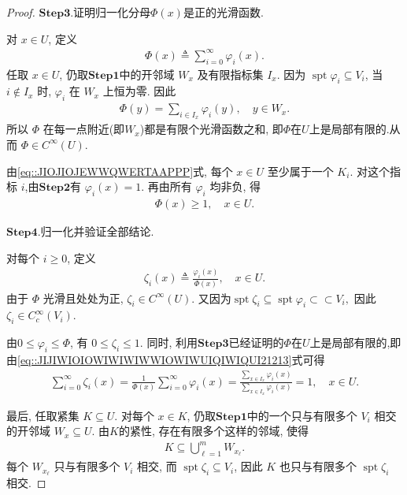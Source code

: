 \documentclass[../../main.tex]{subfiles}
\begin{document}
\begin{proof}
\noindent$\mathbf{Step}\mathbf{3}.${\heiti 证明归一化分母$\Phi(x)$是正的光滑函数.}

对 $x\in U$, 定义
\begin{align*}
\Phi(x)\triangleq\sum\limits_{i=0}^{\infty}\varphi_i(x).
\end{align*}
任取 $x\in U$, 仍取$\mathbf{Step}\mathbf{1}$中的开邻域 $W_x$ 及有限指标集 $I_x$. 因为 $\operatorname{spt}\varphi_i\subseteq V_i$, 当 $i\notin I_x$ 时, $\varphi_i$ 在 $W_x$ 上恒为零. 因此
\begin{align}\label{eq::JIJIWIOIOWIWIWIWWIOWIWUIQIWIQUI21213}
\Phi(y)=\sum\limits_{i\in I_x}\varphi_i(y),\quad y\in W_x.
\end{align}
所以 $\Phi$ 在每一点附近(即$W_x$)都是有限个光滑函数之和, 即$\Phi$在$U$上是局部有限的.从而 $\Phi\in C^\infty(U)$.

由\eqref{eq::JIOJIOJEWWQWERTAAPPP}式, 每个 $x\in U$ 至少属于一个 $K_i$. 对这个指标 $i$,由$\mathbf{Step}\mathbf{2}$有 $\varphi_i(x)=1$. 再由所有 $\varphi_i$ 均非负, 得
\begin{align*}
\Phi(x)\geqslant1,\quad x\in U.
\end{align*}

\noindent$\mathbf{Step}\mathbf{4}.${\heiti 归一化并验证全部结论.}

对每个 $i\geqslant0$, 定义
\begin{align*}
\zeta_i(x)\triangleq\frac{\varphi_i(x)}{\Phi(x)},\quad x\in U.
\end{align*}
由于 $\Phi$ 光滑且处处为正, $\zeta_i\in C^\infty(U)$. 又因为$\operatorname{spt}\zeta_i
\subseteq\operatorname{spt}\varphi_i
\subset\subset V_i,$
因此 $\zeta_i\in C_c^\infty(V_i)$.

由$0\leqslant\varphi_i\leqslant\Phi$, 有 $0\leqslant\zeta_i\leqslant1$. 同时, 利用$\mathbf{Step}\mathbf{3}$已经证明的$\Phi$在$U$上是局部有限的,即由\eqref{eq::JIJIWIOIOWIWIWIWWIOWIWUIQIWIQUI21213}式可得
\begin{align*}
\sum_{i=0}^{\infty}{\zeta _i\left( x \right)}=\frac{1}{\Phi \left( x \right)}\sum_{i=0}^{\infty}{\varphi _i\left( x \right)}=\frac{\sum\limits_{x\in I_x}{\varphi _i\left( x \right)}}{\sum\limits_{x\in I_x}{\varphi _i\left( x \right)}}=1,\quad x\in U.
\end{align*}

最后, 任取紧集 $K\subseteq U$. 对每个 $x\in K$, 仍取$\mathbf{Step}\mathbf{1}$中的一个只与有限多个 $V_i$ 相交的开邻域 $W_x\subseteq U$. 由$K$的紧性, 存在有限多个这样的邻域, 使得
\begin{align*}
K\subseteq\bigcup\limits_{\ell=1}^{m}W_{x_\ell}.
\end{align*}
每个 $W_{x_\ell}$ 只与有限多个 $V_i$ 相交, 而 $\operatorname{spt}\zeta_i\subseteq V_i$, 因此 $K$ 也只与有限多个 $\operatorname{spt}\zeta_i$ 相交.
\end{proof}
\end{document}

